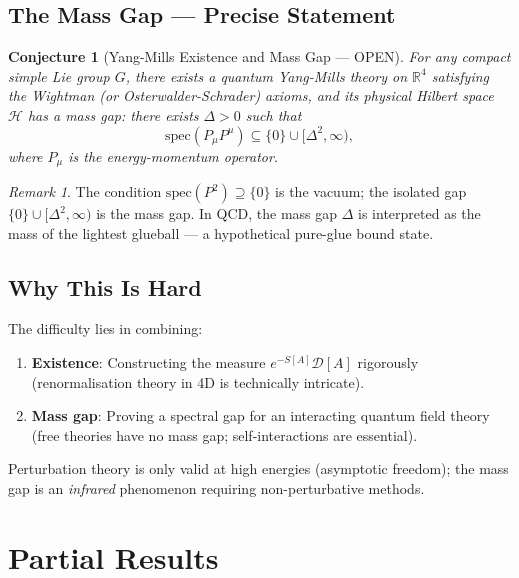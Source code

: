 \documentclass[12pt,a4paper]{amsart}
\newtheorem{conjecture}[theorem]{Conjecture}
\theoremstyle{definition}
\theoremstyle{remark}
\newtheorem{remark}[theorem]{Remark}
\begin{document}
\subsection{The Mass Gap — Precise Statement}

\begin{conjecture}[Yang-Mills Existence and Mass Gap — OPEN]
\label{conj:mass-gap-precise}
For any compact simple Lie group $G$, there exists a quantum Yang-Mills theory on
$\mathbb{R}^4$ satisfying the Wightman (or Osterwalder-Schrader) axioms, and its
physical Hilbert space $\mathcal{H}$ has a \emph{mass gap}: there exists $\Delta > 0$
such that
\[
  \mathrm{spec}(P_\mu P^\mu) \subseteq \{0\} \cup [\Delta^2, \infty),
\]
where $P_\mu$ is the energy-momentum operator.
\end{conjecture}

\begin{remark}
The condition $\mathrm{spec}(P^2) \supseteq \{0\}$ is the vacuum; the isolated gap
$\{0\} \cup [\Delta^2, \infty)$ is the mass gap. In QCD, the mass gap $\Delta$ is
interpreted as the mass of the lightest glueball — a hypothetical pure-glue bound state.
\end{remark}

\subsection{Why This Is Hard}

The difficulty lies in combining:
\begin{enumerate}[noitemsep]
  \item \textbf{Existence}: Constructing the measure $e^{-S[A]} \mathcal{D}[A]$ rigorously
    (renormalisation theory in 4D is technically intricate).
  \item \textbf{Mass gap}: Proving a spectral gap for an interacting quantum field theory
    (free theories have no mass gap; self-interactions are essential).
\end{enumerate}
Perturbation theory is only valid at high energies (asymptotic freedom); the mass gap
is an \emph{infrared} phenomenon requiring non-perturbative methods.

\section{Partial Results}
\label{sec:partial}
\end{document}
